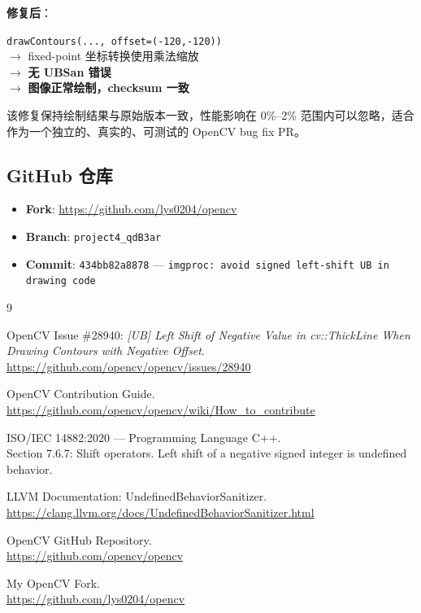 \documentclass[12pt,a4paper]{article}
\begin{document}
\textbf{修复后}：
\begin{center}
\texttt{drawContours(..., offset=(-120,-120))} \\
$\rightarrow$ fixed-point 坐标转换使用乘法缩放 \\
$\rightarrow$ \textbf{无 UBSan 错误} \\
$\rightarrow$ \textbf{图像正常绘制，checksum 一致}
\end{center}

该修复保持绘制结果与原始版本一致，性能影响在 0\%–2\% 范围内可以忽略，适合作为一个独立的、真实的、可测试的 OpenCV bug fix PR。

\subsection*{GitHub 仓库}

\begin{itemize}[leftmargin=*]
    \item \textbf{Fork}: \url{https://github.com/lys0204/opencv}
    \item \textbf{Branch}: \texttt{project4\_qdB3ar}
    \item \textbf{Commit}: \texttt{434bb82a8878} --- \texttt{imgproc: avoid signed left-shift UB in drawing code}
\end{itemize}

\begin{thebibliography}{9}

OpenCV Issue \#28940: \textit{[UB] Left Shift of Negative Value in cv::ThickLine When Drawing Contours with Negative Offset}.\\
\url{https://github.com/opencv/opencv/issues/28940}

OpenCV Contribution Guide.\\
\url{https://github.com/opencv/opencv/wiki/How\_to\_contribute}

ISO/IEC 14882:2020 --- Programming Language C++.\\
Section 7.6.7: Shift operators. Left shift of a negative signed integer is undefined behavior.

LLVM Documentation: UndefinedBehaviorSanitizer.\\
\url{https://clang.llvm.org/docs/UndefinedBehaviorSanitizer.html}

OpenCV GitHub Repository.\\
\url{https://github.com/opencv/opencv}

My OpenCV Fork.\\
\url{https://github.com/lys0204/opencv}

\end{thebibliography}
\end{document}

